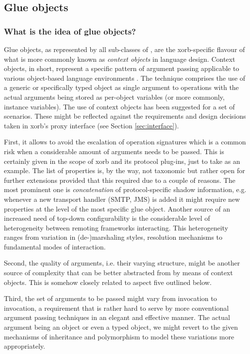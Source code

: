   \subsection{Glue objects}\label{sec:advanced:xorb:gobjects}
  \subsubsection{What is the idea of glue objects?}\label{sec:advanced:xorb:gobjects:what}
  Glue objects, as represented by all sub-classes of , are the xorb-specific flavour of what is more commonly known as \emph{context objects} in language design. Context objects, in short, represent a specific pattern of argument passing applicable to various object-based language environments \cite{zdun:2005b}. The technique comprises the use of a generic or specifically typed object as single argument to operations with the actual arguments being stored as per-object variables (or more commonly, instance variables). The use of context objects has been suggested for a set of scenarios. These might be reflected against the requirements and design decisions taken in xorb's proxy interface (see Section \ref{sec:interface}).
  
First, it allows to avoid the escalation of operation signatures which is a common risk when a considerable amount of arguments needs to be passed. This is certainly given in the scope of xorb and its protocol plug-ins, just to take  as an example. The list of properties is, by the way, not taxonomic but rather open for further extensions provided that this required due to a couple of reasons. The most prominent one is \emph{concatenation} of protocol-specific shadow information, e.g. whenever a new transport handler (SMTP, JMS) is added it might require new properties at the level of the most specific glue object. Another source of an increased need of top-down configurability is the considerable level of heterogeneity between remoting frameworks interacting. This heterogeneity ranges from variation in (de-)marshaling styles, resolution mechanisms to fundamental modes of interaction.

Second, the quality of arguments, i.e. their varying structure, might be another source of complexity that can be better abstracted from by means of context objects. This is somehow closely related to aspect five outlined below.

Third, the set of arguments to be passed might vary from invocation to invocation, a requirement that is rather hard to serve by more conventional argument passing techniques in an elegant and effective manner. The actual argument being an object or even a typed object, we might revert to the given mechanisms of inheritance and polymorphism to model these variations more appropriately.

